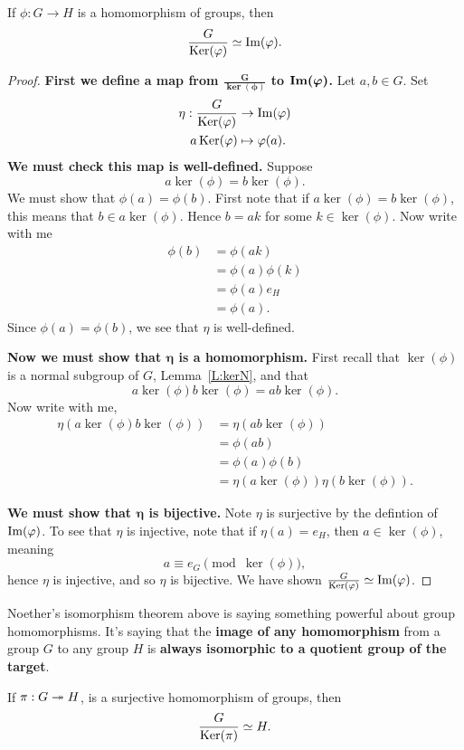 \documentclass{ximera}
\begin{document}
\begin{theorem}\label{T:NI}
  If $\phi:G\to H$ is a homomorphism of groups, then
  \[
  \frac{G}{\mathop{\mathrm{Ker}}\nolimits(\varphi)} \simeq \operatorname{Im}(\varphi).
  \]
  \begin{proof}
    \textbf{First we define a map from $\boldsymbol{\frac{G}{\ker(\phi)}}$ to $\boldsymbol{\operatorname{Im}(\varphi)}$.}
    Let $a,b\in G$. Set
    \begin{align*}
      \eta: \frac{G}{\mathop{\mathrm{Ker}}\nolimits(\varphi)} &\to \operatorname{Im}(\varphi)\\
      a\mathop{\mathrm{Ker}}\nolimits(\varphi) &\mapsto \varphi(a).
    \end{align*}
    \textbf{We must check this map is
      well-defined.} Suppose
    \[
    a \ker(\phi) = b\ker(\phi).
    \]
    We must show that $\phi(a) = \phi(b)$. First note that if $a
    \ker(\phi) = b\ker(\phi)$, this means that $b\in
    a\ker(\phi)$. Hence $b = ak$ for some $k\in\ker(\phi)$. Now write
    with me
    \begin{align*}
      \phi(b) &=\phi(ak)\\
      &=\phi(a)\phi(k)\\
      &=\phi(a) e_H\\
      &=\phi(a).
    \end{align*}
    Since $\phi(a) = \phi(b)$, we see that $\eta$ is well-defined.


    
    \textbf{Now we must show that $\boldsymbol\eta$ is a
      homomorphism.} First recall that $\ker(\phi)$ is a normal
    subgroup of $G$, Lemma~\ref{L:kerN}, and that
    \[
    a\ker(\phi) b\ker(\phi)  =  ab\ker(\phi).
    \]
    Now write with me, 
    \begin{align*}
    \eta(a\ker(\phi) b\ker(\phi)) &= \eta(ab\ker(\phi))\\
    &= \phi(ab)\\
    &= \phi(a)\phi(b)\\
    &= \eta(a\ker(\phi)) \eta(b\ker(\phi)).
    \end{align*}



    \textbf{We must show that $\boldsymbol\eta$ is bijective.} Note
    $\eta$ is surjective by the defintion of $\operatorname{Im}(\varphi)$.  To see that
    $\eta$ is injective, note that if $\eta(a) = e_H$, then $a\in
    \ker(\phi)$, meaning
    \[
    a\equiv e_G \pmod{\ker(\phi)},
    \]
    hence $\eta$ is injective, and so $\eta$ is bijective. We have
    shown $\frac{G}{\mathop{\mathrm{Ker}}\nolimits(\varphi)} \simeq \operatorname{Im}(\varphi)$.
  \end{proof}
\end{theorem}

Noether's isomorphism theorem above is saying something powerful about
group homomorphisms. It's saying that the \textbf{image of any
  homomorphism} from a group $G$ to any group $H$ is \textbf{always
  isomorphic to a quotient group of the target}.


\begin{corollary}
  If $\pi:G\twoheadrightarrow H$, is a surjective homomorphism of groups, then
  \[
  \frac{G}{\mathop{\mathrm{Ker}}\nolimits(\pi)} \simeq H.
  \]
\end{corollary}
\end{document}
